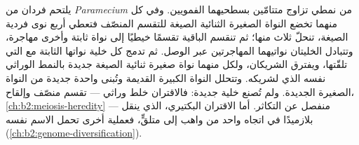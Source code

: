 \begin{proposition}\label{prop:b2:unicellular-diversity:conjugation}
يلتحم فردان من \emph{Paramecium} من نمطي تزاوج متتامّين بسطحيهما
الفمويين. وفي كل منهما تخضع النواة الصغيرة الثنائية الصيغة للتقسم
المنصّف فتعطي أربع نوى فردية الصيغة، تنحلّ ثلاث منها؛ ثم تنقسم
الباقية تقسمًا خيطيًا إلى نواة ثابتة وأخرى مهاجرة، وتتبادل الخليتان
نواتيهما المهاجرتين عبر الوصل. ثم تدمج كل خلية نواتها الثابتة مع
التي تلقّتها، ويفترق الشريكان، ولكل منهما نواة صغيرة ثنائية الصيغة
جديدة بالنمط الوراثي نفسه الذي لشريكه. وتتحلل النواة الكبيرة
القديمة وتُبنى واحدة جديدة من النواة الصغيرة الجديدة. ولم تُصنع
خلية جديدة: فالاقتران خلط وراثي --- تقسم منصّف وإلقاح،
\cref{ch:b2:meiosis-heredity} --- منفصل عن التكاثر. أما الاقتران
البكتيري، الذي ينقل بلازميدًا في اتجاه واحد من واهب إلى متلقٍّ،
فعملية أخرى تحمل الاسم نفسه
(\cref{ch:b2:genome-diversification}).
\end{proposition}


